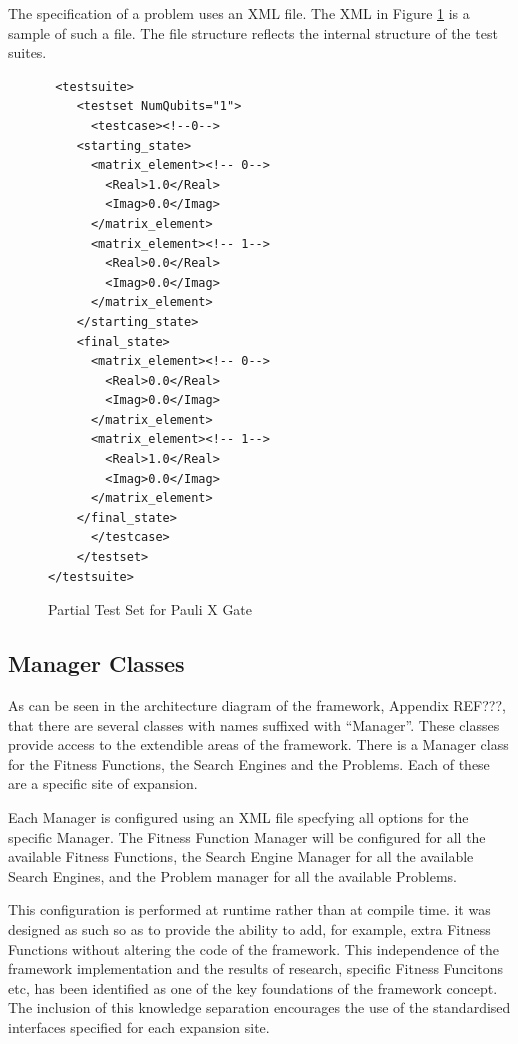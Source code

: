 \documentclass[authoryearcitations]{UoYCSproject}
\begin{document}
The specification of a problem uses an XML file.
The XML in Figure \ref{code:paulixtestset} is a sample of such a file.
The file structure reflects the internal structure of the test suites.

\lstset{language = XML}
\begin{figure}
 \begin{lstlisting}
 <testsuite>
    <testset NumQubits="1">
      <testcase><!--0-->
	<starting_state>
	  <matrix_element><!-- 0-->
	    <Real>1.0</Real>
	    <Imag>0.0</Imag>
	  </matrix_element>
	  <matrix_element><!-- 1-->
	    <Real>0.0</Real>
	    <Imag>0.0</Imag>
	  </matrix_element>
	</starting_state>
	<final_state>
	  <matrix_element><!-- 0-->
	    <Real>0.0</Real>
	    <Imag>0.0</Imag>
	  </matrix_element>
	  <matrix_element><!-- 1-->
	    <Real>1.0</Real>
	    <Imag>0.0</Imag>
	  </matrix_element>
	</final_state>
      </testcase>
    </testset>
</testsuite>
 \end{lstlisting}
\label{code:paulixtestset}
\caption{Partial Test Set for Pauli X Gate}
\end{figure}

\subsection{Manager Classes}
As can be seen in the architecture diagram of the framework, Appendix REF???, that there are several classes with names suffixed with ``Manager''.
These classes provide access to the extendible areas of the framework.
There is a Manager class for the Fitness Functions, the Search Engines and the Problems.
Each of these are a specific site of expansion.

Each Manager is configured using an XML file specfying all options for the specific Manager.
The Fitness Function Manager will be configured for all the available Fitness Functions, the Search Engine Manager for all the available Search Engines, and the Problem manager for all the available Problems.

This configuration is performed at runtime rather than at compile time.
it was designed as such so as to provide the ability to add, for example, extra Fitness Functions without altering the code of the framework.
This independence of the framework implementation and the results of research, specific Fitness Funcitons etc, has been identified as one of the key foundations of the framework concept.
The inclusion of this knowledge separation encourages the use of the standardised interfaces specified for each expansion site.
\end{document}

